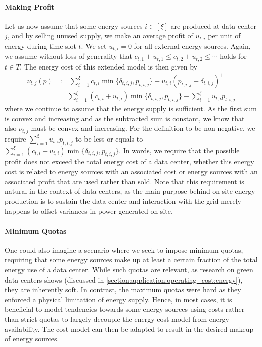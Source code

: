 \paragraph{Making Profit} Let us now assume that some energy sources $i \in [\xi]$ are produced at data center $j$, and by selling unused supply, we make an average profit of $u_{t,i}$ per unit of energy during time slot $t$. We set $u_{t,i} = 0$ for all external energy sources. Again, we assume without loss of generality that $c_{t,1} + u_{t,1} \leq c_{t,2} + u_{t,2} \leq \cdots$ holds for $t \in T$. The energy cost of this extended model is then given by \begin{align*}
    \nu_{t,j}(p) &:= \sum_{i=1}^{\xi} c_{t,i} \min\{\delta_{t,i,j}, p_{t,i,j}\} - u_{t,i} (p_{t,i,j} - \delta_{t,i,j})^+ \\
                 &= \sum_{i=1}^{\xi} (c_{t,i} + u_{t,i}) \min\{\delta_{t,i,j}, p_{t,i,j}\} - \sum_{i=1}^{\xi} u_{t,i} p_{t,i,j}
\end{align*} where we continue to assume that the energy supply is sufficient. As the first sum is convex and increasing and as the subtracted sum is constant, we know that also $\nu_{t,j}$ must be convex and increasing. For the definition to be non-negative, we require $\sum_{i=1}^{\xi} u_{t,i} p_{t,i,j}$ to be less or equals to $\sum_{i=1}^{\xi} (c_{t,i} + u_{t,i}) \min\{\delta_{t,i,j}, p_{t,i,j}\}$. In words, we require that the possible profit does not exceed the total energy cost of a data center, whether this energy cost is related to energy sources with an associated cost or energy sources with an associated profit that are used rather than sold. Note that this requirement is natural in the context of data centers, as the main purpose behind on-site energy production is to sustain the data center and interaction with the grid merely happens to offset variances in power generated on-site.

\paragraph{Minimum Quotas} One could also imagine a scenario where we seek to impose minimum quotas, requiring that some energy sources make up at least a certain fraction of the total energy use of a data center. While such quotas are relevant, as research on green data centers shows (discussed in \cref{section:application:operating_cost:energy}), they are inherently soft. In contrast, the maximum quotas were hard as they enforced a physical limitation of energy supply. Hence, in most cases, it is beneficial to model tendencies towards some energy sources using costs rather than strict quotas to largely decouple the energy cost model from energy availability. The cost model can then be adapted to result in the desired makeup of energy sources.

